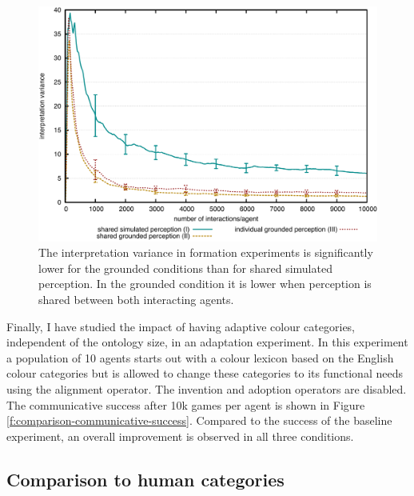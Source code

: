 \begin{figure}[htbp]
\begin{center}
  \includegraphics[width=.9\textwidth]{./experiments/figures/grounding-formation-interpretation-variance.pdf}
  \caption[Interpretation variance in grounded formation experiment in
  three experimental conditions]{The interpretation variance in
    formation experiments is significantly lower for the grounded
    conditions than for shared simulated perception. In the grounded
    condition it is lower when perception is shared between both
    interacting agents.}
\label{f:formation-interpretation-variance}
\end{center}
\end{figure}

Finally, I have studied the impact of having adaptive colour
categories, independent of the ontology size, in an adaptation
experiment. In this experiment a population of 10 agents starts out
with a colour lexicon based on the English colour categories but is
allowed to change these categories to its functional needs using the
alignment operator. The invention and adoption operators are
disabled. The communicative success after 10k games per agent is shown
in Figure \ref{f:comparison-communicative-success}. Compared to the
success of the baseline experiment, an overall improvement is observed
in all three conditions.

\subsection{Comparison to human categories}

